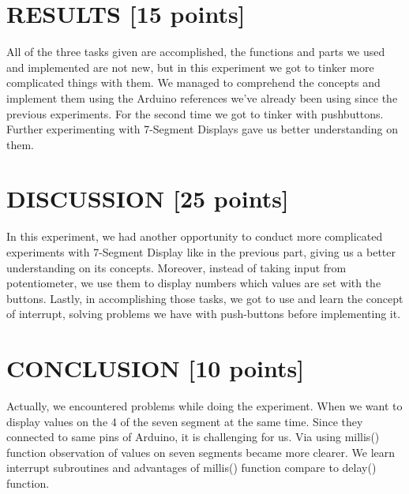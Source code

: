 \documentclass[pdftex,12pt,a4paper]{article}
\begin{document}
\section{RESULTS [15 points]}
All of the three tasks given are accomplished, the functions and parts we used and implemented are not new, but in this experiment we got to tinker more complicated things with them. We managed to comprehend the concepts and implement them using the Arduino references we've already been using since the previous experiments. For the second time we got to tinker with pushbuttons. Further experimenting with 7-Segment Displays gave us better understanding on them.  
\section{DISCUSSION [25 points]}
In this experiment, we had another opportunity to conduct more complicated experiments with 7-Segment Display like in the previous part, giving us a better understanding on its concepts. Moreover, instead of taking input from potentiometer, we use them to display numbers which values are set with the buttons. Lastly, in accomplishing those tasks, we got to use and learn the concept of interrupt, solving problems we have with push-buttons before implementing it. 

\section{CONCLUSION [10 points]}
Actually, we encountered problems while doing the experiment. When we want to display values on the 4 of the seven segment at the same time. Since they connected to same pins of Arduino, it is challenging for us. Via using millis() function observation of values on seven segments became more clearer. We learn interrupt subroutines and advantages of millis() function compare to delay() function.

\newpage
{}



\end{document}
